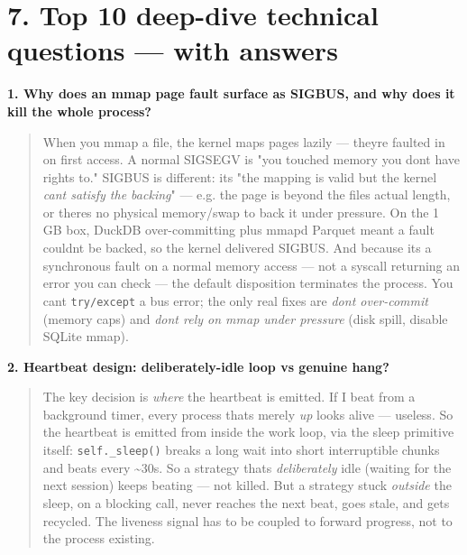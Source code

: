 \documentclass[11pt]{article}
\begin{document}
\section{7. Top 10 deep-dive technical questions --- with answers}\label{7-top-10-deep-dive-technical-questions--with-answers}

\textbf{1. Why does an mmap page fault surface as SIGBUS, and why does it kill the whole process?}

\begin{quote}
When you mmap a file, the kernel maps pages lazily --- they\textquotesingle re faulted in on first access. A
normal SIGSEGV is "you touched memory you don\textquotesingle t have rights to." SIGBUS is different: it\textquotesingle s "the
mapping is valid but the kernel \emph{can\textquotesingle t satisfy the backing}" --- e.g. the page is beyond the
file\textquotesingle s actual length, or there\textquotesingle s no physical memory/swap to back it under pressure. On the 1 GB
box, DuckDB over-committing plus mmap\textquotesingle d Parquet meant a fault couldn\textquotesingle t be backed, so the kernel
delivered SIGBUS. And because it\textquotesingle s a synchronous fault on a normal memory access --- not a syscall
returning an error you can check --- the default disposition terminates the process. You can\textquotesingle t
\texttt{try/except} a bus error; the only real fixes are \emph{don\textquotesingle t over-commit} (memory caps) and \emph{don\textquotesingle t
rely on mmap under pressure} (disk spill, disable SQLite mmap).
\end{quote}

\textbf{2. Heartbeat design: deliberately-idle loop vs genuine hang?}

\begin{quote}
The key decision is \emph{where} the heartbeat is emitted. If I beat from a background timer, every
process that\textquotesingle s merely \emph{up} looks alive --- useless. So the heartbeat is emitted from inside the
work loop, via the sleep primitive itself: \texttt{self.\_sleep()} breaks a long wait into short
interruptible chunks and beats every \textasciitilde30s. So a strategy that\textquotesingle s \emph{deliberately} idle (waiting for
the next session) keeps beating --- not killed. But a strategy stuck \emph{outside} the sleep, on a
blocking call, never reaches the next beat, goes stale, and gets recycled. The liveness signal
has to be coupled to forward progress, not to the process existing.
\end{quote}
\end{document}
